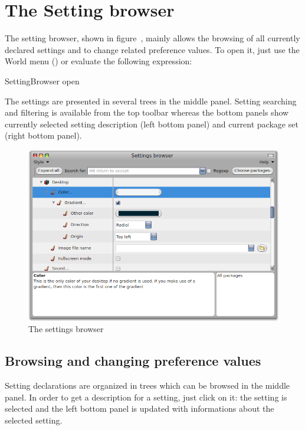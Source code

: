 \documentclass[a4paper,10pt,twoside]{book}
\begin{document}
\section{The Setting browser}
\label{sec:TheSettingsBrowser}
The setting browser, shown in figure~, mainly allows the browsing of all currently declared settings and to change related preference values. To open it, just use the World menu () or evaluate the following expression:
\begin{code}{}
SettingBrowser open
\end{code}
The settings are presented in several trees in the middle panel. Setting searching and filtering is available from the top toolbar whereas the bottom panels show currently selected setting description (left bottom panel) and current package set (right bottom panel). 
\begin{figure}[tbh]
\begin{center}
\includegraphics[scale=0.3]{SettingBrowser}
\caption{The settings browser}
\end{center}
\end{figure}

\subsection{Browsing and changing preference values}
Setting declarations are organized in trees which can be browsed in the middle panel. In order to get a description for a setting, just click on it: the setting is selected and the left bottom panel is updated with informations about the selected setting. 
\end{document}
